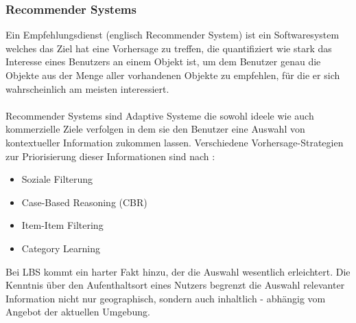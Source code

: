 \subsubsection{Recommender Systems}\label{2_RECSYS}
Ein Empfehlungsdienst (englisch Recommender System) ist ein Softwaresystem welches das Ziel hat eine Vorhersage zu treffen, die quantifiziert wie stark das Interesse eines Benutzers an einem Objekt ist, um dem Benutzer genau die Objekte aus der Menge aller vorhandenen Objekte zu empfehlen, für die er sich wahrscheinlich am meisten interessiert. \cite{RECSYS:WIKIDEF}\\ \\
Recommender Systems sind Adaptive Systeme die sowohl ideele wie auch kommerzielle Ziele verfolgen
in dem sie den Benutzer eine Auswahl von kontextueller Information zukommen lassen.
Verschiedene Vorhersage-Strategien zur Priorisierung dieser Informationen sind nach \cite{COMPASS:AH}: 
\begin{itemize}[leftmargin=*,noitemsep,topsep=1ex,parsep=0pt,partopsep=0pt]
\item Soziale Filterung
\item Case-Based Reasoning (CBR)
\item Item-Item Filtering
\item Category Learning
\end{itemize}
Bei LBS kommt ein harter Fakt hinzu, der die Auswahl wesentlich erleichtert. Die Kenntnis über den Aufenthaltsort eines Nutzers begrenzt die Auswahl relevanter Information nicht nur geographisch, sondern auch inhaltlich - abhängig vom Angebot der aktuellen Umgebung.




